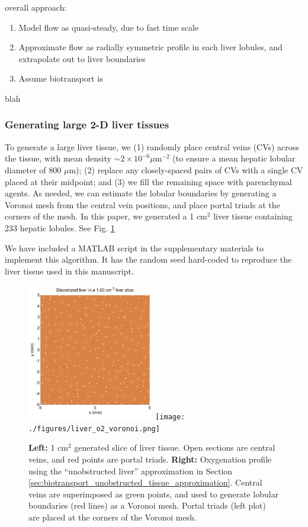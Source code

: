 \documentclass[smallextended,natbib,draft]{svjour3}
\newcommand{\micron}{\mu\textrm{m}}
\begin{document}
overall approach:
\begin{enumerate}
\item  
Model flow as quasi-steady, due to fast time scale 
\item 
Approximate flow as radially symmetric profile in each liver lobules, and extrapolate out to liver boundaries
\item 
Assume biotransport is 
\end{enumerate}

blah 

\subsubsection{Generating large 2-D liver tissues}
\label{sec:generate_liver}
To generate a large liver tissue, we (1) 
randomly place central veins (CVs) across the tissue, with  
mean density $\sim 2 \times 10^{-6} \micron^{-2}$ 
(to ensure a mean hepatic lobular diameter 
of 800 $\micron$); (2) replace any closely-spaced pairs of CVs with a 
single CV placed at their midpoint; and (3) we fill the remaining space 
with parenchymal agents. As needed, we can estimate the lobular boundaries 
by generating a Voronoi mesh from the central vein positions, and place 
portal triads at the corners of the mesh. 
In this paper, we generated a 1 cm$^2$ liver 
tissue containing 233 hepatic lobules. See Fig. \ref{fig:generated_liver} 

We have included a MATLAB script in the supplementary materials 
to implement this algorithm. It has the random seed hard-coded 
to reproduce the liver tissue used in this manuscript. 

\begin{figure}[tbh]
\includegraphics[height=6cm]{./figures/discrete_liver_tissue.png}
\texttt{[image: ./figures/liver\_o2\_voronoi.png]}
\caption{\textbf{Left:} 1 cm$^2$ generated slice of liver tissue. Open sections 
are central veins, and red points are portal triads. 
\textbf{Right: } Oxygenation profile using the 
``unobstructed liver'' approximation in Section \ref{sec:biotransport_unobstructed_tissue_approximation}. Central veins are 
superimposed as green points, and used to generate lobular boundaries (red lines) 
as a Voronoi mesh. Portal triads (left plot) are placed at the corners of the 
Voronoi mesh.
} 
\label{fig:generated_liver}
\end{figure}
\end{document}
